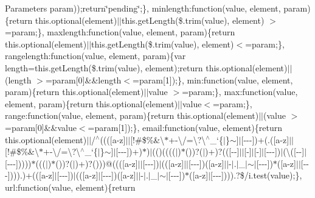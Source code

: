 {\begin{DoxyParams}{Parameters}
param));return\char`\"{}pending\char`\"{};\}, minlength\+:function(value, element, param)\{return this.\+optional(element)$\vert$$\vert$this.get\+Length(\$.trim(value), element) $>$=param;\}, maxlength\+:function(value, element, param)\{return this.\+optional(element)$\vert$$\vert$this.get\+Length(\$.trim(value), element)$<$=param;\}, rangelength\+:function(value, element, param)\{var length=this.\+get\+Length(\$.trim(value), element);return this.\+optional(element)$\vert$$\vert$(length $>$=param\mbox{[}0\mbox{]}\&\&length$<$=param\mbox{[}1\mbox{]});\}, min\+:function(value, element, param)\{return this.\+optional(element)$\vert$$\vert$value $>$=param;\}, max\+:function(value, element, param)\{return this.\+optional(element)$\vert$$\vert$value$<$=param;\}, range\+:function(value, element, param)\{return this.\+optional(element)$\vert$$\vert$(value $>$=param\mbox{[}0\mbox{]}\&\&value$<$=param\mbox{[}1\mbox{]});\}, email\+:function(value, element)\{return this.\+optional(element)$\vert$$\vert$/$^\wedge$(((\mbox{[}a-\/z\mbox{]}$\vert$$\vert$\mbox{[}!\#\$\%\&\textquotesingle{}\textbackslash{}$\ast$+-\/\textbackslash{}/=\textbackslash{}?\textbackslash{}$^\wedge$\+\_\+`\{$|$\}$\sim$\mbox{]}$\vert$\mbox{[}-\/-\/-\/\mbox{]})+(.(\mbox{[}a-\/z\mbox{]}$\vert$$\vert$\mbox{[}!\#\$\%\&\textquotesingle{}\textbackslash{}$\ast$+-\/\textbackslash{}/=\textbackslash{}?\textbackslash{}$^\wedge$\+\_\+`\{$|$\}$\sim$\mbox{]}$\vert$\mbox{[}-\/-\/-\/\mbox{]})+)$\ast$)$\vert$(()(((($\vert$)$\ast$())?($\vert$)+)?((\mbox{[}-\/-\/\mbox{]}$\vert$$\vert$\mbox{[}-\/\mbox{]}$\vert$\mbox{[}-\/\mbox{]}$\vert$\mbox{[}-\/-\/-\/\mbox{]})$\vert$(\textbackslash{}(\mbox{[}-\/-\/\mbox{]}$\vert$\mbox{[}-\/-\/-\/\mbox{]}))))$\ast$((($\vert$)$\ast$())?($\vert$)+)?()))@(((\mbox{[}a-\/z\mbox{]}$\vert$$\vert$\mbox{[}-\/-\/-\/\mbox{]})$\vert$((\mbox{[}a-\/z\mbox{]}$\vert$$\vert$\mbox{[}-\/-\/-\/\mbox{]})(\mbox{[}a-\/z\mbox{]}$\vert$$\vert$-\/$\vert$.$\vert$\+\_\+$\vert$$\sim$$\vert$\mbox{[}-\/-\/-\/\mbox{]})$\ast$(\mbox{[}a-\/z\mbox{]}$\vert$$\vert$\mbox{[}-\/-\/-\/\mbox{]}))).)+((\mbox{[}a-\/z\mbox{]}$\vert$\mbox{[}-\/-\/-\/\mbox{]})$\vert$((\mbox{[}a-\/z\mbox{]}$\vert$\mbox{[}-\/-\/-\/\mbox{]})(\mbox{[}a-\/z\mbox{]}$\vert$$\vert$-\/$\vert$.$\vert$\+\_\+$\vert$$\sim$$\vert$\mbox{[}-\/-\/-\/\mbox{]})$\ast$(\mbox{[}a-\/z\mbox{]}$\vert$\mbox{[}-\/-\/-\/\mbox{]}))).?\$/i.test(value);\}, url\+:function(value, element)\{return 
\end{DoxyParams}}
